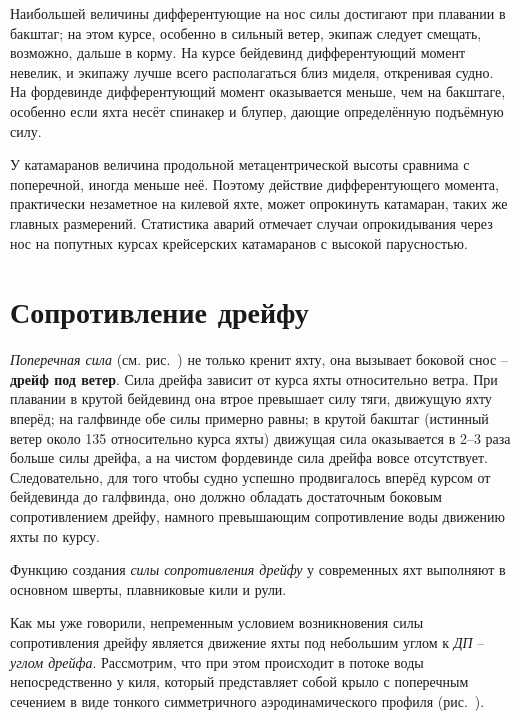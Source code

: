 Наибольшей величины дифферентующие на нос силы достигают при плавании
в бакштаг; на этом курсе, особенно в сильный ветер, экипаж следует
смещать, возможно, дальше в корму. На курсе бейдевинд дифферентующий
момент невелик, и экипажу лучше всего располагаться близ миделя,
откренивая судно. На фордевинде дифферентующий момент оказывается
меньше, чем на бакштаге, особенно если яхта несёт спинакер и блупер,
дающие определённую подъёмную силу.

У катамаранов величина продольной метацентрической высоты сравнима с
поперечной, иногда меньше неё. Поэтому действие дифферентующего
момента, практически незаметное на килевой яхте, может опрокинуть
катамаран, таких же главных размерений. Статистика аварий отмечает
случаи опрокидывания через нос на попутных курсах крейсерских
катамаранов с высокой парусностью.

\section{Сопротивление дрейфу}\label{sec:drift_resistance}

\textit{Поперечная сила}  (см. рис.~)
не только кренит яхту, она вызывает боковой снос \---
\textbf{дрейф под ветер}. Сила дрейфа зависит от курса яхты
относительно ветра. При плавании в крутой бейдевинд она втрое
превышает силу тяги, движущую яхту вперёд; на галфвинде обе силы
примерно равны; в крутой бакштаг (истинный ветер около 135\gr
относительно курса яхты) движущая сила оказывается в 2--3 раза больше
силы дрейфа, а на чистом фордевинде сила дрейфа вовсе
отсутствует. Следовательно, для того чтобы судно успешно продвигалось
вперёд курсом от бейдевинда до галфвинда, оно должно обладать
достаточным боковым сопротивлением дрейфу, намного превышающим
сопротивление воды движению яхты по курсу.

Функцию создания \textit{силы сопротивления дрейфу}
у современных яхт выполняют в основном шверты, плавниковые кили и рули.

Как мы уже говорили, непременным условием возникновения силы
сопротивления дрейфу является движение яхты под небольшим углом к
\textit{ДП} \--- \textit{углом дрейфа}. Рассмотрим, что при этом происходит в
потоке воды непосредственно у киля, который представляет собой крыло с
поперечным сечением в виде тонкого симметричного аэродинамического
профиля (рис.~).

